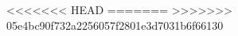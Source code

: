 \renewcommand{\tabularxcolumn}[1]{m{#1}}

\makeatletter
<<<<<<< HEAD
=======
>>>>>>> 05e4bc90f732a2256057f2801e3d7031b6f66130
\makeatother

\makeatletter
{}
\makeatother